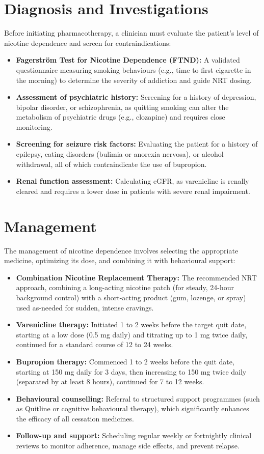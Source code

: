 \section*{Diagnosis and Investigations}
Before initiating pharmacotherapy, a clinician must evaluate the patient's level of nicotine dependence and screen for contraindications:
\begin{itemize}
    \item \textbf{Fagerstr\"{o}m Test for Nicotine Dependence (FTND):} A validated questionnaire measuring smoking behaviours (e.g., time to first cigarette in the morning) to determine the severity of addiction and guide NRT dosing.
    \item \textbf{Assessment of psychiatric history:} Screening for a history of depression, bipolar disorder, or schizophrenia, as quitting smoking can alter the metabolism of psychiatric drugs (e.g., clozapine) and requires close monitoring.
    \item \textbf{Screening for seizure risk factors:} Evaluating the patient for a history of epilepsy, eating disorders (bulimia or anorexia nervosa), or alcohol withdrawal, all of which contraindicate the use of bupropion.
    \item \textbf{Renal function assessment:} Calculating eGFR, as varenicline is renally cleared and requires a lower dose in patients with severe renal impairment.
\end{itemize}

\section*{Management}
The management of nicotine dependence involves selecting the appropriate medicine, optimizing its dose, and combining it with behavioural support:
\begin{itemize}
    \item \textbf{Combination Nicotine Replacement Therapy:} The recommended NRT approach, combining a long-acting nicotine patch (for steady, 24-hour background control) with a short-acting product (gum, lozenge, or spray) used as-needed for sudden, intense cravings.
    \item \textbf{Varenicline therapy:} Initiated 1 to 2 weeks before the target quit date, starting at a low dose (0.5 mg daily) and titrating up to 1 mg twice daily, continued for a standard course of 12 to 24 weeks.
    \item \textbf{Bupropion therapy:} Commenced 1 to 2 weeks before the quit date, starting at 150 mg daily for 3 days, then increasing to 150 mg twice daily (separated by at least 8 hours), continued for 7 to 12 weeks.
    \item \textbf{Behavioural counselling:} Referral to structured support programmes (such as Quitline or cognitive behavioural therapy), which significantly enhances the efficacy of all cessation medicines.
    \item \textbf{Follow-up and support:} Scheduling regular weekly or fortnightly clinical reviews to monitor adherence, manage side effects, and prevent relapse.
\end{itemize}

